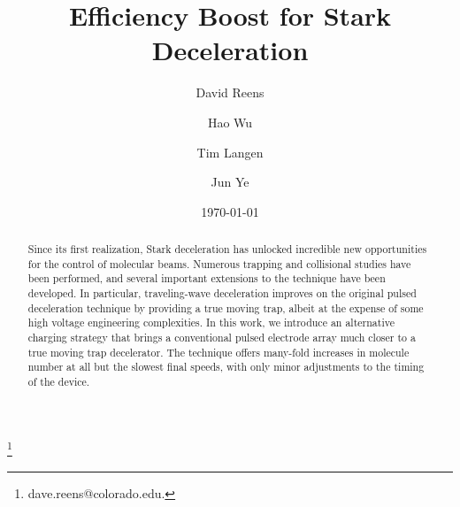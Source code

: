 \documentclass[%
 reprint,
 amsmath,amssymb,
 aps,
pra,
]{revtex4-1}
\begin{document}
\title{Efficiency Boost for Stark Deceleration}%

\author{David Reens}
\thanks{dave.reens@colorado.edu.}

\author{Hao Wu}

\author{Tim Langen}%

\author{Jun Ye}


\date{\today}


\begin{abstract}
Since its first realization, Stark deceleration has unlocked incredible new opportunities for the control of molecular beams. 
Numerous trapping and collisional studies have been performed, and several important extensions to the technique have been developed. 
In particular, traveling-wave deceleration improves on the original pulsed deceleration technique by providing a true moving trap, albeit at the expense of some high voltage engineering complexities.
In this work, we introduce an alternative charging strategy that brings a conventional pulsed electrode array much closer to a true moving trap decelerator.
The technique offers many-fold increases in molecule number at all but the slowest final speeds, with only minor adjustments to the timing of the device.
\end{abstract}


\maketitle


\end{document}
